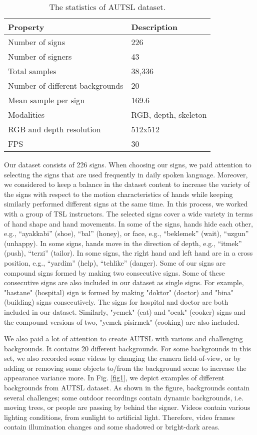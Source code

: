 \documentclass[11pt, a4paper, singlecolumn]{article}
\begin{document}
 
\begin{table}[t]
	\caption{The statistics of AUTSL dataset.}
	\centering
	\label{tab:table2}
	\begin{tabular}{ ll }
		\hline
		\textbf{Property} & \textbf{Description} \\ \hline
		Number of signs       & 226   \\ 
		Number of signers     & 43   \\ 
		Total samples       & 38,336  \\ 
		Number of different backgrounds       & 20   \\ 
		Mean sample per sign    & 169.6   \\ 
		Modalities     & RGB, depth, skeleton  \\ 
		RGB and depth resolution    & 512x512  \\ 
		FPS     & 30  \\ \hline
		
	\end{tabular}
\end{table}


Our dataset consists of 226 signs. When choosing our signs, we paid attention to selecting the signs that are used frequently in daily spoken language. Moreover, we considered to keep a balance in the dataset content to increase the variety of the signs with respect to the motion characteristics of hands while keeping similarly performed different signs at the same time. In this process, we worked with a group of TSL instructors. The selected signs cover a wide variety in terms of hand shape and hand movements. In some of the signs, hands hide each other, e.g., “ayakkabi” (shoe), “bal” (honey), or face, e.g., “beklemek” (wait), “uzgun” (unhappy). In some signs, hands move in the direction of depth, e.g., “itmek” (push), “terzi” (tailor). In some signs, the right hand and left hand are in a cross position, e.g., “yardim” (help), “tehlike” (danger). Some of our signs are compound signs formed by making two consecutive signs. Some of these consecutive signs are also included in our dataset as single signs. For example, "hastane" (hospital) sign is formed by making "doktor" (doctor) and "bina" (building) signs consecutively. The signs for hospital and doctor are both included in our dataset. Similarly, "yemek" (eat) and "ocak" (cooker) signs and the compound versions of two, "yemek pisirmek" (cooking) are also included.

We also paid a lot of attention to create AUTSL with various and challenging backgrounds. It contains 20 different backgrounds. For some backgrounds in this set, we also recorded some videos by changing the camera field-of-view, or by adding or removing some objects to/from the background scene to increase the appearance variance more. In Fig. \ref{fig1}, we depict examples of different backgrounds from AUTSL dataset. As shown in the figure, backgrounds contain several challenges; some outdoor recordings contain dynamic backgrounds, i.e. moving trees, or people are passing by behind the signer. Videos contain various lighting conditions, from sunlight to artificial light. Therefore, video frames contain illumination changes and some shadowed or bright-dark areas.
\end{document}
